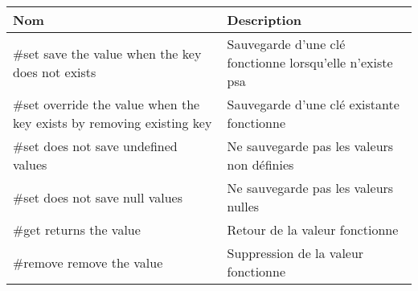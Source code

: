 \begin{tabular}{P{0.3\textwidth}P{0.6\textwidth}}
\hline
\bf Nom
&
\bf Description
\\
\hline
\hline
\#set save the value when the key does not exists
&
Sauvegarde d'une clé fonctionne lorsqu'elle n'existe psa
\\
\#set override the value when the key exists by removing existing key
&
Sauvegarde d'une clé existante fonctionne
\\
\#set does not save undefined values
&
Ne sauvegarde pas les valeurs non définies
\\
\#set does not save null values
&
Ne sauvegarde pas les valeurs nulles
\\
\#get returns the value
&
Retour de la valeur fonctionne
\\
\#remove remove the value
&
Suppression de la valeur fonctionne
\\
\hline
\end{tabular}